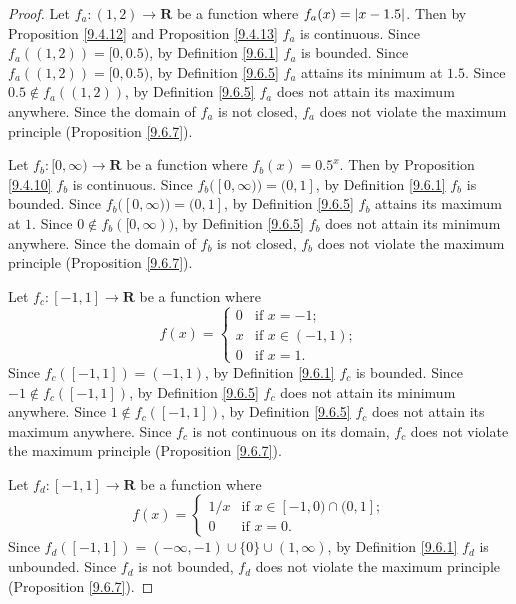 \begin{proof}
    Let \(f_a : (1, 2) \to \mathbf{R}\) be a function where \(f_a(x) = \abs*{x - 1.5}\).
    Then by Proposition \ref{9.4.12} and Proposition \ref{9.4.13} \(f_a\) is continuous.
    Since \(f_a((1, 2)) = [0, 0.5)\), by Definition \ref{9.6.1} \(f_a\) is bounded.
    Since \(f_a((1, 2)) = [0, 0.5)\), by Definition \ref{9.6.5} \(f_a\) attains its minimum at \(1.5\).
    Since \(0.5 \notin f_a((1, 2))\), by Definition \ref{9.6.5} \(f_a\) does not attain its maximum anywhere.
    Since the domain of \(f_a\) is not closed, \(f_a\) does not violate the maximum principle (Proposition \ref{9.6.7}).

    Let \(f_b : [0, \infty) \to \mathbf{R}\) be a function where \(f_b(x) = 0.5^x\).
    Then by Proposition \ref{9.4.10} \(f_b\) is continuous.
    Since \(f_b([0, \infty)) = (0, 1]\), by Definition \ref{9.6.1} \(f_b\) is bounded.
    Since \(f_b([0, \infty)) = (0, 1]\), by Definition \ref{9.6.5} \(f_b\) attains its maximum at \(1\).
    Since \(0 \notin f_b([0, \infty))\), by Definition \ref{9.6.5} \(f_b\) does not attain its minimum anywhere.
    Since the domain of \(f_b\) is not closed, \(f_b\) does not violate the maximum principle (Proposition \ref{9.6.7}).

    Let \(f_c : [-1, 1] \to \mathbf{R}\) be a function where
    \[
        f(x) = \begin{cases}
            0 & \text{if } x = -1;        \\
            x & \text{if } x \in (-1, 1); \\
            0 & \text{if } x = 1.
        \end{cases}
    \]
    Since \(f_c([-1, 1]) = (-1, 1)\), by Definition \ref{9.6.1} \(f_c\) is bounded.
    Since \(-1 \notin f_c([-1, 1])\), by Definition \ref{9.6.5} \(f_c\) does not attain its minimum anywhere.
    Since \(1 \notin f_c([-1, 1])\), by Definition \ref{9.6.5} \(f_c\) does not attain its maximum anywhere.
    Since \(f_c\) is not continuous on its domain, \(f_c\) does not violate the maximum principle (Proposition \ref{9.6.7}).

    Let \(f_d : [-1, 1] \to \mathbf{R}\) be a function where
    \[
        f(x) = \begin{cases}
            1 / x & \text{if } x \in [-1, 0) \cap (0, 1]; \\
            0     & \text{if } x = 0.
        \end{cases}
    \]
    Since \(f_d([-1, 1]) = (-\infty, -1) \cup \{0\} \cup (1, \infty)\), by Definition \ref{9.6.1} \(f_d\) is unbounded.
    Since \(f_d\) is not bounded, \(f_d\) does not violate the maximum principle (Proposition \ref{9.6.7}).
\end{proof}

